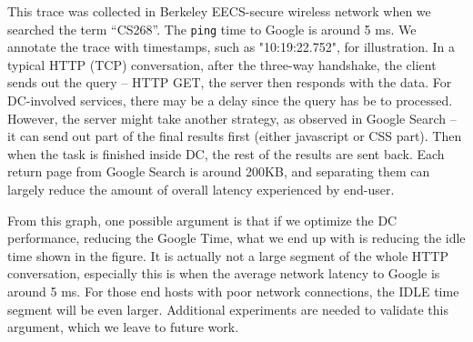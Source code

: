 This trace was collected in Berkeley EECS-secure wireless network when we searched the term ``CS268''. The \texttt{ping} time to Google is around 5 ms. We annotate the trace with timestamps, such as "10:19:22.752", for illustration. In a typical HTTP (TCP) conversation, after the three-way handshake, the client sends out the query -- HTTP GET, the server then responds with the data. For DC-involved services, there may be a delay since the query has be to processed. However, the server might take another strategy, as observed in Google Search -- it can send out part of the final results first (either javascript or CSS part). Then when the task is finished inside DC, the rest of the results are sent back. Each return page from Google Search is around 200KB, and separating them can largely reduce the amount of overall latency experienced by end-user. 

From this graph, one possible argument is that if we optimize the DC performance, reducing the Google Time, what we end up with is reducing the idle time shown in the figure. It is actually not a large segment of the whole HTTP conversation, especially this is when the average network latency to Google is around 5 ms. For those end hosts with poor network connections, the IDLE time segment will be even larger. Additional experiments are needed to validate this argument, which we leave to future work.


